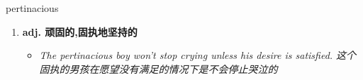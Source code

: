 
\begin{frame}
{\huge pertinacious}
\begin{center}
\begin{enumerate}\Large
  \item \textbf{adj. 顽固的,固执地坚持的}
  \begin{itemize}
    \item \em{\Large{The pertinacious boy won’t stop crying unless his desire is satisfied. 这个固执的男孩在愿望没有满足的情况下是不会停止哭泣的}}
  \end{itemize}
\end{enumerate}
\end{center}
\end{frame}
